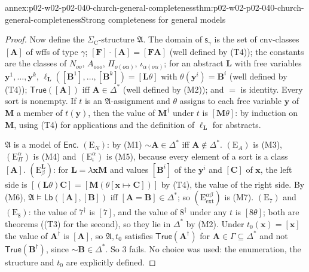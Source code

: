 \begin{annexitem}{annex:p02-w02-p02-040-church-general-completeness}{thm:p02-w02-p02-040-church-general-completeness}{Strong completeness for general models}
\begin{proof}
Now define the \(\Sigma_{\mathrm C}\)-structure \(\mathfrak A\).  The domain of
\(\mathsf s_\gamma\) is the set of \(\mathrel{\mathrm{cnv}}\)-classes \([\mathbf A]\) of wffs of
type \(\gamma\); \([\mathbf F]\cdot[\mathbf A]=[\mathbf F\mathbf A]\) (well defined by
(T4)); the constants are the classes of \(N_{oo}\), \(A_{ooo}\),
\(\Pi_{o(o\alpha)}\), \(\iota_{\alpha(o\alpha)}\); for an abstract \(\mathbf L\) with
free variables \(\mathbf y^1,\ldots,\mathbf y^k\),
\(\ell_{\mathbf L}([\mathbf B^1],\ldots,[\mathbf B^k])=[\mathbf L\theta]\) with
\(\theta(\mathbf y^i)=\mathbf B^i\) (well defined by (T4)); \(\mathsf{True}([\mathbf A])\)
iff \(\mathbf A\in\Delta^*\) (well defined by (M2)); and \(=\) is identity.
Every sort is nonempty.  If \(t\) is an \(\mathfrak A\)-assignment and
\(\theta\) assigns to each free variable \(\mathbf y\) of \(\mathbf M\) a member of
\(t(\mathbf y)\), then the value of \(\mathbf M^\dagger\) under \(t\) is
\([\mathbf M\theta]\): by induction on \(\mathbf M\), using (T4) for applications
and the definition of \(\ell_{\mathbf L}\) for abstracts.

\(\mathfrak A\) is a model of \(\mathsf{Enc}\).  \((\mathrm E_N)\): by (M1)
\(\sim\mathbf A\in\Delta^*\) iff \(\mathbf A\notin\Delta^*\).  \((\mathrm E_A)\) is
(M3), \((\mathrm E_\Pi^\alpha)\) is (M4) and \((\mathrm E_\iota^\alpha)\) is (M5),
because every element of a sort is a class \([\mathbf A]\).
\((\mathrm E_\beta^{\mathbf L})\): for \(\mathbf L=\lambda\mathbf x\mathbf M\) and values
\([\mathbf B^i]\) of the \(\mathbf y^i\) and \([\mathbf C]\) of \(\mathbf x\), the left side
is \([(\mathbf L\theta)\mathbf C]=[\mathbf M(\theta[\mathbf x\mapsto\mathbf C])]\) by (T4),
the value of the right side.  By (M6), \(\mathfrak A\models\mathsf{Lb}([\mathbf A],[\mathbf B])\)
iff \([\mathbf A=\mathbf B]\in\Delta^*\); so \((\mathrm E_{\mathrm{ext}}^{\alpha\beta})\) is
(M7).  \((\mathrm E_7)\) and \((\mathrm E_8)\): the value of \(7^\dagger\) is
\([7]\), and the value of \(8^\dagger\) under any \(t\) is \([8\theta]\); both
are theorems ((T3) for the second), so they lie in \(\Delta^*\) by (M2).
Under \(t_0(\mathbf x)=[\mathbf x]\) the value of \(\mathbf A^\dagger\) is \([\mathbf A]\),
so \(\mathfrak A,t_0\) satisfies \(\mathsf{True}(\mathbf A^\dagger)\) for
\(\mathbf A\in\Gamma\subseteq\Delta^*\) and not \(\mathsf{True}(\mathbf B^\dagger)\),
since \(\sim\mathbf B\in\Delta^*\).  So 3 fails.  No choice was used: the
enumeration, the structure and \(t_0\) are explicitly defined.


\end{proof}
\end{annexitem}
